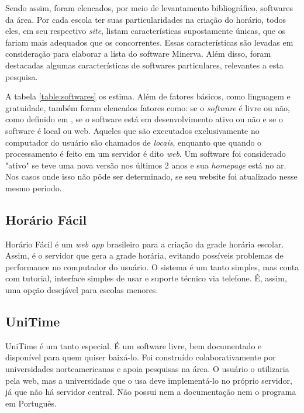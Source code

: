 \documentclass[12pt,a4paper]{article}
\begin{document}
		\par Sendo assim, foram elencados, por meio de levantamento bibliográfico, softwares da área. Por cada escola ter suas particularidades na criação do horário, todos eles, em seu respectivo \textit{site}, listam características supostamente únicas, que os fariam mais adequados que os concorrentes. Essas características são levadas em consideração para elaborar a lista do software Minerva. Além disso, foram destacadas algumas características de softwares particulares, relevantes a esta pesquisa.

		\par A tabela \ref{table:softwares} os estima. Além de fatores básicos, como linguagem e gratuidade, também foram elencados fatores como: se o \textit{software} é livre ou não, como definido em \cite{publico}, se o software está em desenvolvimento ativo ou não e se o software é local ou web. Aqueles que são executados exclusivamente no computador do usuário são chamados de \textit{locais}, enquanto que quando o processamento é feito em um servidor é dito \textit{web}.  Um software foi considerado "ativo" se teve uma nova versão nos últimos 2 anos e sua \textit{homepage} está no ar. Nos casos onde isso não pôde ser determinado, se seu website foi atualizado nesse mesmo período.

		\subsection{Horário Fácil}

			\par Horário Fácil é um \textit{web app} brasileiro para a criação da grade horária escolar. Assim, é o servidor que gera a grade horária, evitando possíveis problemas de performance no computador do usuário. O sistema é um tanto simples, mas conta com tutorial, interface simples de usar e suporte técnico via telefone. É, assim, uma opção desejável para escolas menores.


		\subsection{UniTime}

			\par UniTime é um tanto especial. É um software livre, bem documentado e disponível para quem quiser baixá-lo. Foi construído colaborativamente por universidades norteamericanas e apoia pesquisas na área. O usuário o utilizaria pela web, mas a universidade que o usa deve implementá-lo no próprio servidor, já que não há servidor central. Não possui nem a documentação nem o programa em Português.
\end{document}
